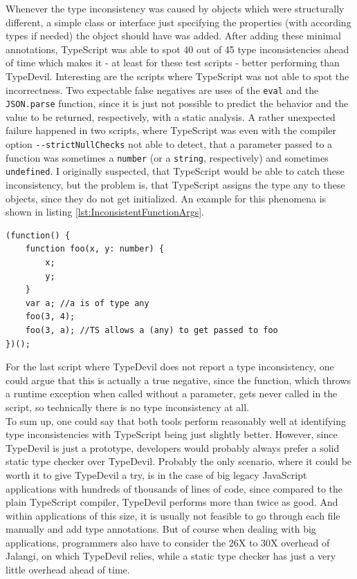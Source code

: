 \documentclass[runningheads,a4paper]{llncs}
\begin{document}
Whenever the type inconsistency was caused by objects which were structurally different, a simple class or interface just specifying the properties (with according types if needed) the object should have was added.
After adding these minimal annotations, TypeScript was able to spot 40 out of 45 type inconsistencies ahead of time which makes it - at least for these test scripts - better performing than TypeDevil.
Interesting are the scripts where TypeScript was not able to spot the incorrectness.
Two expectable false negatives are uses of the \lstinline[columns=fixed]{eval} and the \lstinline[columns=fixed]{JSON.parse} function, since it is just not possible to predict the behavior and the value to be returned, respectively, with a static analysis.
A rather unexpected failure happened in two scripts, where TypeScript was even with the compiler option \lstinline[columns=fixed]{--strictNullChecks} not able to detect, that a parameter passed to a function was sometimes a \lstinline[columns=fixed]{number} (or a \lstinline[columns=fixed]{string}, respectively) and sometimes \lstinline[columns=fixed]{undefined}.
I originally suspected, that TypeScript would be able to catch these inconsistency, but the problem is, that TypeScript assigns the type any to these objects, since they do not get initialized.
An example for this phenomena is shown in listing \ref{lst:InconsistentFunctionArgs}.

\medskip\medskip
\lstset{language=javascript}
\begin{minipage}{\linewidth}
\begin{lstlisting}[frame=single, caption=Inconsistent Function Args , label={lst:InconsistentFunctionArgs}]
(function() {
    function foo(x, y: number) {
        x;
        y;
    } 
    var a; //a is of type any
    foo(3, 4);
    foo(3, a); //TS allows a (any) to get passed to foo
})();
\end{lstlisting}
\end{minipage}
For the last script where TypeDevil does not report a type inconsistency, one could argue that this is actually a true negative, since the function, which throws a runtime exception when called without a parameter, gets never called in the script, so technically there is no type inconsistency at all.\\
To sum up, one could say that both tools perform reasonably well at identifying type inconsistencies with TypeScript being just slightly better.
However, since TypeDevil is just a prototype, developers would probably always prefer a solid static type checker over TypeDevil.
Probably the only scenario, where it could be worth it to give TypeDevil a try, is in the case of big legacy JavaScript applications with hundreds of thousands of lines of code, since compared to the plain TypeScript compiler, TypeDevil performs more than twice as good.
And within applications of this size, it is usually not feasible to go through each file manually and add type annotations. 
But of course when dealing with big applications, programmers also have to consider the 26X to 30X overhead of Jalangi, on which TypeDevil relies, while a static type checker has just a very little overhead ahead of time.
\end{document}
